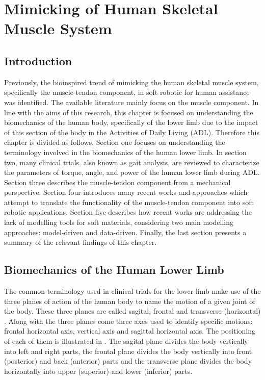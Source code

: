 \chapter{Mimicking of Human Skeletal Muscle System} \label{sec:mimicHSMS}

\section{Introduction}

Previously, the bioinspired trend of mimicking the human skeletal muscle system, specifically the muscle-tendon component, in soft robotic for human assistance was identified. The available literature mainly focus on the muscle component. In line with the aims of this research, this chapter is focused on understanding the biomechanics of the human body, specifically of the lower limb due to the impact of this section of the body in the Activities of Daily Living (ADL). Therefore this chapter is divided as follows.
Section one focuses on understanding the terminology involved in the biomechanics of the human lower limb. In section two, many clinical trials, also known as gait analysis, are reviewed to characterize the parameters of torque, angle, and power of the human lower limb during ADL. Section three describes the muscle-tendon component from a mechanical perspective. Section four introduces many recent works and approaches which attempt to translate the functionality of the muscle-tendon component into soft robotic applications. Section five describes how recent works are addressing the lack of modelling tools for soft materials, considering two main modelling approaches: model-driven and data-driven. Finally, the last section presents a summary of the relevant findings of this chapter.

\section{Biomechanics of the Human Lower Limb}

The common terminology used in clinical trials for the lower limb make use of the three planes of action of the human body to name the motion of a given joint of the body. These three planes are called sagital, frontal and transverse (horizontal) \cite{PhysicalSolutions2016}. Along with the three planes come three axes used to identify specific motions: frontal horizontal axis, vertical axis and sagittal horizontal axis. The positioning of each of them is illustrated in . The sagital plane divides the body vertically into left and right parts, the frontal plane divides the body vertically into front (posterior) and back (anterior) parts and the transverse plane divides the body horizontally into upper (superior) and lower (inferior) parts.


